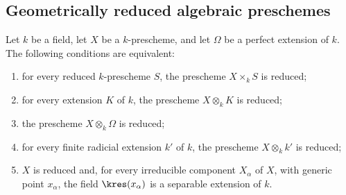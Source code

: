 \subsection{Geometrically reduced algebraic preschemes}
\label{subsection:IV.4.6}
\label{IV.4.6}

\begin{proposition}[4.6.1]
\label{IV.4.6.1}
Let $k$ be a field, let $X$ be a $k$-prescheme, and let $\Omega$ be a
perfect extension of $k$.
The following conditions are equivalent:
\begin{enumerate}
\item[\rm(a)]
\label{IV.4.6.1.a}
for every reduced $k$-prescheme $S$, the prescheme $X\times_k S$ is
reduced;

\item[\rm(b)]
\label{IV.4.6.1.b}
for every extension $K$ of $k$, the prescheme $X\otimes_k K$ is
reduced;

\item[\rm(c)]
\label{IV.4.6.1.c}
the prescheme $X\otimes_k\Omega$ is reduced;

\item[\rm(d)]
\label{IV.4.6.1.d}
for every finite radicial extension $k'$ of $k$, the prescheme
$X\otimes_k k'$ is reduced;

\item[\rm(e)]
\label{IV.4.6.1.e}
$X$ is reduced and, for every irreducible component $X_\alpha$ of
$X$, with generic point $x_\alpha$, the field $\kres(x_\alpha)$ is a
separable extension of $k$.
\end{enumerate}
\end{proposition}

